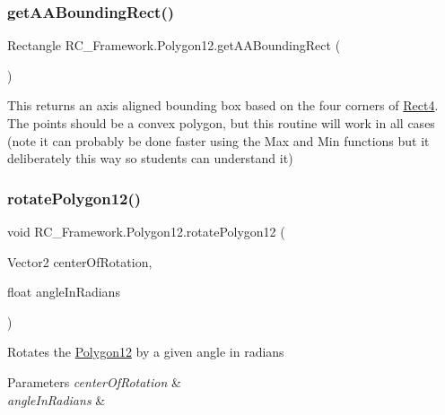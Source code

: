 \subsubsection{\texorpdfstring{get\+A\+A\+Bounding\+Rect()}{getAABoundingRect()}}
{\footnotesize\ttfamily Rectangle R\+C\+\_\+\+Framework.\+Polygon12.\+get\+A\+A\+Bounding\+Rect (\begin{DoxyParamCaption}{ }\end{DoxyParamCaption})}



This returns an axis aligned bounding box based on the four corners of \mbox{\hyperlink{class_r_c___framework_1_1_rect4}{Rect4}}. The points should be a convex polygon, but this routine will work in all cases (note it can probably be done faster using the Max and Min functions but it deliberately this way so students can understand it) 

\mbox{\label{class_r_c___framework_1_1_polygon12_a652b0913ffee96a6c53e56d6e26aba45}} 
\subsubsection{\texorpdfstring{rotate\+Polygon12()}{rotatePolygon12()}}
{\footnotesize\ttfamily void R\+C\+\_\+\+Framework.\+Polygon12.\+rotate\+Polygon12 (\begin{DoxyParamCaption}\item[{Vector2}]{center\+Of\+Rotation,  }\item[{float}]{angle\+In\+Radians }\end{DoxyParamCaption})}



Rotates the \mbox{\hyperlink{class_r_c___framework_1_1_polygon12}{Polygon12}} by a given angle in radians 


\begin{DoxyParams}{Parameters}
{\em center\+Of\+Rotation} & \\
\hline
{\em angle\+In\+Radians} & \\
\hline
\end{DoxyParams}
\mbox{\label{class_r_c___framework_1_1_polygon12_a41b3194bb88382ab68f1252b673548a5}} 
